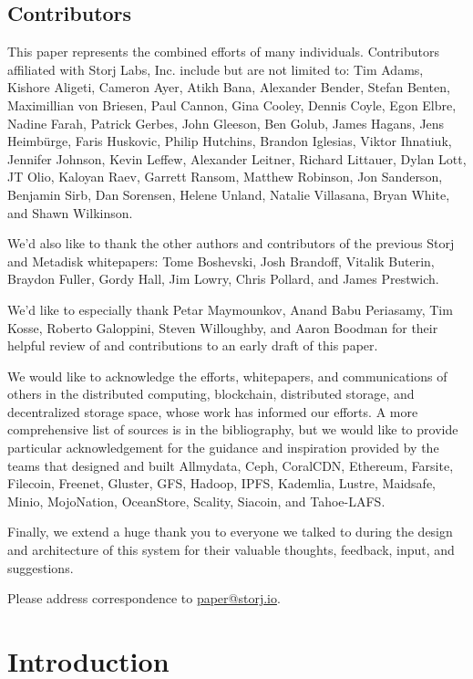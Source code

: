 \documentclass[8pt,fleqn,openany]{book}
\begin{document}
\section{Contributors}

This paper represents the combined efforts of many individuals.
Contributors affiliated with Storj Labs, Inc. include but are not limited to:
Tim Adams,
Kishore Aligeti,
Cameron Ayer,
Atikh Bana,
Alexander Bender,
Stefan Benten,
Maximillian von Briesen,
Paul Cannon,
Gina Cooley,
Dennis Coyle,
Egon Elbre,
Nadine Farah,
Patrick Gerbes,
John Gleeson,
Ben Golub,
James Hagans,
Jens Heimbürge,
Faris Huskovic,
Philip Hutchins,
Brandon Iglesias,
Viktor Ihnatiuk,
Jennifer Johnson,
Kevin Leffew,
Alexander Leitner,
Richard Littauer,
Dylan Lott,
JT Olio,
Kaloyan Raev,
Garrett Ransom,
Matthew Robinson,
Jon Sanderson,
Benjamin Sirb,
Dan Sorensen,
Helene Unland,
Natalie Villasana,
Bryan White,
and Shawn Wilkinson.

We'd also like to thank the other authors and contributors of the
previous Storj and Metadisk whitepapers:
Tome Boshevski,
Josh Brandoff,
Vitalik Buterin,
Braydon Fuller,
Gordy Hall,
Jim Lowry,
Chris Pollard,
and James Prestwich.

We'd like to especially thank
Petar Maymounkov,
Anand Babu Periasamy,
Tim Kosse,
Roberto Galoppini,
Steven Willoughby,
and Aaron Boodman
for their helpful review of and contributions to an early draft of this paper.

We would like to acknowledge the efforts, whitepapers, and communications of
others in the distributed computing, blockchain, distributed storage, and
decentralized storage space, whose work has informed our efforts. A more
comprehensive list of sources is in the bibliography, but we would like to
provide particular acknowledgement for the guidance and inspiration provided
by the teams that designed and built
Allmydata,
Ceph,
CoralCDN,
Ethereum,
Farsite,
Filecoin,
Freenet,
Gluster,
GFS,
Hadoop,
IPFS,
Kademlia,
Lustre,
Maidsafe,
Minio,
MojoNation,
OceanStore,
Scality,
Siacoin,
and Tahoe-LAFS.

Finally, we extend a huge thank you to everyone we talked to during the
design and architecture of this system for their valuable thoughts, feedback,
input, and suggestions.

Please address correspondence to \href{mailto:paper@storj.io}{paper@storj.io}.

\chapter{Introduction}\label{chap:intro}
\end{document}
